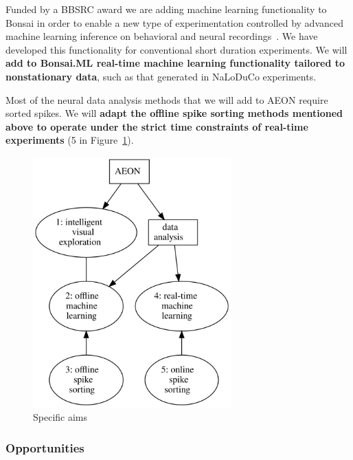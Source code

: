 Funded by a BBSRC award we are adding machine learning functionality to Bonsai
in order to enable a new type of experimentation controlled by advanced machine
learning inference on behavioral and neural
recordings~\citep[Bonsai.ML,][]{bonsaiML25}. We have developed this
functionality for conventional short duration experiments. We will
\textbf{add to Bonsai.ML real-time machine learning functionality tailored to
nonstationary data}, such as that generated in NaLoDuCo experiments.

Most of the neural data analysis methods that we will add to AEON require
sorted spikes. We will \textbf{adapt the offline spike sorting methods
mentioned above to operate under the strict time constraints of real-time
experiments} (5 in Figure~\ref{fig:aims}).

\begin{figure}
    \begin{center}
        \includegraphics[width=3in]{figures/aims.png}
    \end{center}
    \caption{Specific aims}
    \label{fig:aims}
\end{figure}

\subsubsection{Opportunities}

